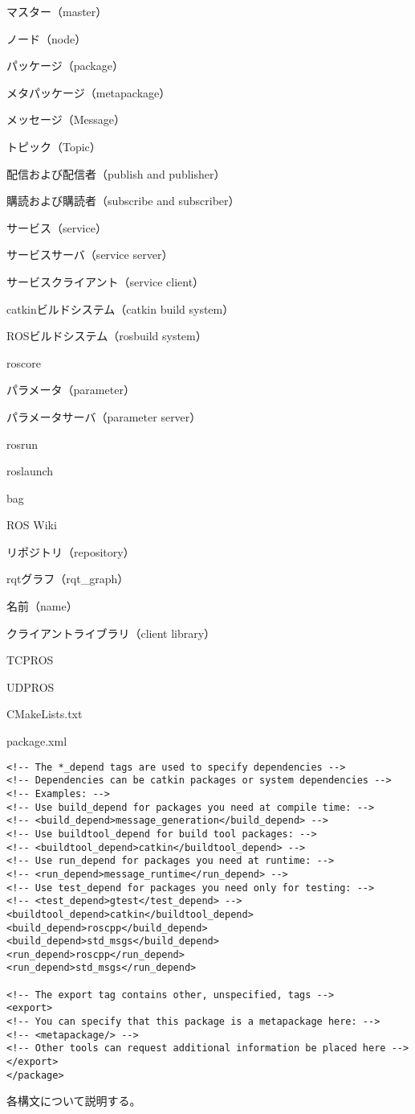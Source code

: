 \begin{term}{マスター（master）}
\begin{term}{ノード（node）}
\begin{term}{パッケージ（package）}
\begin{term}{メタパッケージ（metapackage）}
\begin{term}{メッセージ（Message）}
\begin{term}{トピック（Topic）}
\begin{term}{配信および配信者（publish and publisher）}
\begin{term}{購読および購読者（subscribe and subscriber）}
\begin{term}{サービス（service）}
\begin{term}{サービスサーバ（service server）}
\begin{term}{サービスクライアント（service client）}
\begin{term}{catkinビルドシステム（catkin build system）}
\begin{term}{ROSビルドシステム（rosbuild system）}
\begin{term}{roscore}
\begin{term}{パラメータ（parameter）}
\begin{term}{パラメータサーバ（parameter server）}
\begin{term}{rosrun}
\begin{term}{roslaunch}
\begin{term}{bag}
\begin{term}{ROS Wiki}
\begin{term}{リポジトリ（repository）}
\begin{term}{rqtグラフ（rqt\_graph）}
\begin{term}{名前（name）}
\begin{term}{クライアントライブラリ（client library）}
\begin{term}{TCPROS}
\begin{term}{UDPROS}
\begin{term}{CMakeLists.txt}
\begin{term}{package.xml}
\begin{lstlisting}[language=ROS]
<!-- The *_depend tags are used to specify dependencies -->
<!-- Dependencies can be catkin packages or system dependencies -->
<!-- Examples: -->
<!-- Use build_depend for packages you need at compile time: -->
<!-- <build_depend>message_generation</build_depend> -->
<!-- Use buildtool_depend for build tool packages: -->
<!-- <buildtool_depend>catkin</buildtool_depend> -->
<!-- Use run_depend for packages you need at runtime: -->
<!-- <run_depend>message_runtime</run_depend> -->
<!-- Use test_depend for packages you need only for testing: -->
<!-- <test_depend>gtest</test_depend> -->
<buildtool_depend>catkin</buildtool_depend>
<build_depend>roscpp</build_depend>
<build_depend>std_msgs</build_depend>
<run_depend>roscpp</run_depend>
<run_depend>std_msgs</run_depend>

<!-- The export tag contains other, unspecified, tags -->
<export>
<!-- You can specify that this package is a metapackage here: -->
<!-- <metapackage/> -->
<!-- Other tools can request additional information be placed here -->
</export>
</package>
\end{lstlisting}

各構文について説明する。


\end{term}
\end{term}
\end{term}
\end{term}
\end{term}
\end{term}
\end{term}
\end{term}
\end{term}
\end{term}
\end{term}
\end{term}
\end{term}
\end{term}
\end{term}
\end{term}
\end{term}
\end{term}
\end{term}
\end{term}
\end{term}
\end{term}
\end{term}
\end{term}
\end{term}
\end{term}
\end{term}
\end{term}
